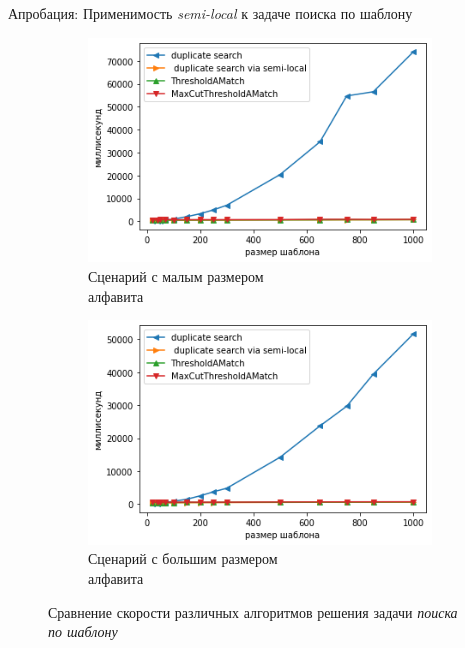 \documentclass[xcolor=table]{beamer}
\begin{document}
\begin{frame}{Апробация: Применимость \emph{semi-local} к задаче  поиска по шаблону}
\begin{figure}
    \centering
    \begin{subfigure}[b]{0.45\textwidth}
    \centering
    \includegraphics[width=\textwidth]{pictures/smallAlphabet.png} \caption{Сценарий с малым размером\\ алфавита}
    \label{fig:subim1}
    \end{subfigure}%
    \begin{subfigure}[b]{0.45\textwidth}
    \centering
    \includegraphics[width=\textwidth]{pictures/largeAlphabet.png}
    \caption{Сценарий с большим размером\\ алфавита}
    \label{fig:subim2}
    \end{subfigure}
\caption{Сравнение скорости различных алгоритмов решения задачи \emph{поиска по шаблону}}\label{ssss}
\end{figure}

\end{frame}
\end{document}
